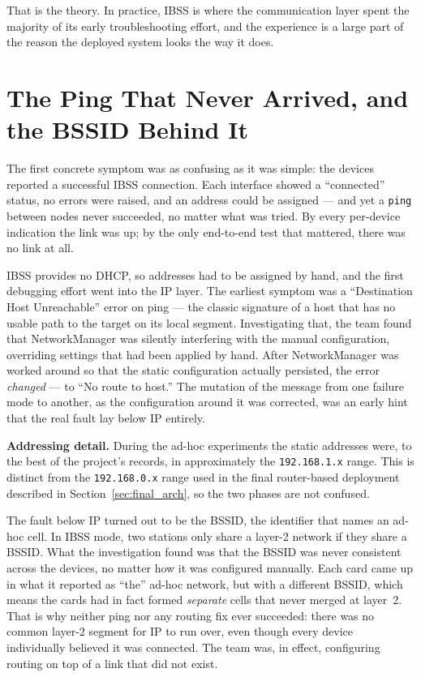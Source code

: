 That is the theory. In practice, IBSS is where the communication layer spent the majority of its early troubleshooting effort, and the experience is a large part of the reason the deployed system looks the way it does.

\section{The Ping That Never Arrived, and the BSSID Behind It}
\label{sec:bssid}

The first concrete symptom was as confusing as it was simple: the devices reported a successful IBSS connection. Each interface showed a ``connected'' status, no errors were raised, and an address could be assigned --- and yet a \texttt{ping} between nodes never succeeded, no matter what was tried. By every per-device indication the link was up; by the only end-to-end test that mattered, there was no link at all.

IBSS provides no DHCP, so addresses had to be assigned by hand, and the first debugging effort went into the IP layer. The earliest symptom was a ``Destination Host Unreachable'' error on ping --- the classic signature of a host that has no usable path to the target on its local segment. Investigating that, the team found that NetworkManager was silently interfering with the manual configuration, overriding settings that had been applied by hand. After NetworkManager was worked around so that the static configuration actually persisted, the error \emph{changed} --- to ``No route to host.'' The mutation of the message from one failure mode to another, as the configuration around it was corrected, was an early hint that the real fault lay below IP entirely.

\begin{notebox}
\textbf{Addressing detail.} During the ad-hoc experiments the static addresses were, to the best of the project's records, in approximately the \texttt{192.168.1.x} range. This is distinct from the \texttt{192.168.0.x} range used in the final router-based deployment described in Section~\ref{sec:final_arch}, so the two phases are not confused.
\end{notebox}

The fault below IP turned out to be the BSSID, the identifier that names an ad-hoc cell. In IBSS mode, two stations only share a layer-2 network if they share a BSSID. What the investigation found was that the BSSID was never consistent across the devices, no matter how it was configured manually. Each card came up in what it reported as ``the'' ad-hoc network, but with a different BSSID, which means the cards had in fact formed \emph{separate} cells that never merged at layer~2. That is why neither ping nor any routing fix ever succeeded: there was no common layer-2 segment for IP to run over, even though every device individually believed it was connected. The team was, in effect, configuring routing on top of a link that did not exist.

